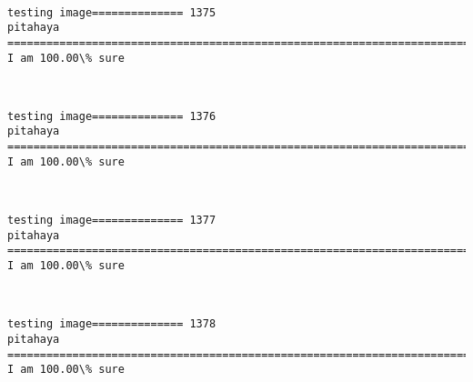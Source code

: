 \documentclass[11pt]{article}
\begin{document}
    \begin{center}
    \end{center}
    { \hspace*{\fill} \\}
    
    \begin{Verbatim}[commandchars=\\\{\}]
testing image============== 1375
pitahaya
============================================================================
I am 100.00\% sure

    \end{Verbatim}

    \begin{center}
    \end{center}
    { \hspace*{\fill} \\}
    
    \begin{Verbatim}[commandchars=\\\{\}]
testing image============== 1376
pitahaya
============================================================================
I am 100.00\% sure

    \end{Verbatim}

    \begin{center}
    \end{center}
    { \hspace*{\fill} \\}
    
    \begin{Verbatim}[commandchars=\\\{\}]
testing image============== 1377
pitahaya
============================================================================
I am 100.00\% sure

    \end{Verbatim}

    \begin{center}
    \end{center}
    { \hspace*{\fill} \\}
    
    \begin{Verbatim}[commandchars=\\\{\}]
testing image============== 1378
pitahaya
============================================================================
I am 100.00\% sure

    \end{Verbatim}
\end{document}
